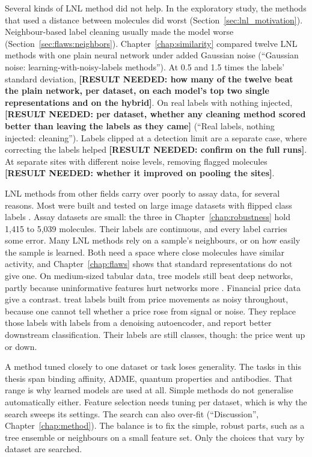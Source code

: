 Several kinds of LNL method did not help. In the exploratory study, the methods that used a distance between molecules did worst (Section~\ref{sec:lnl_motivation}). Neighbour-based label cleaning usually made the model worse (Section~\ref{sec:flaws:neighbors}). Chapter~\ref{chap:similarity} compared twelve LNL methods with one plain neural network under added Gaussian noise (``Gaussian noise: learning-with-noisy-labels methods''). At 0.5 and 1.5 times the labels' standard deviation, \textbf{[RESULT NEEDED: how many of the twelve beat the plain network, per dataset, on each model's top two single representations and on the hybrid]}. On real labels with nothing injected, \textbf{[RESULT NEEDED: per dataset, whether any cleaning method scored better than leaving the labels as they came]} (``Real labels, nothing injected: cleaning''). Labels clipped at a detection limit are a separate case, where correcting the labels helped \textbf{[RESULT NEEDED: confirm on the full runs]}. At separate sites with different noise levels, removing flagged molecules \textbf{[RESULT NEEDED: whether it improved on pooling the sites]}.

LNL methods from other fields carry over poorly to assay data, for several reasons. Most were built and tested on large image datasets with flipped class labels \citep{Song2022}. Assay datasets are small: the three in Chapter~\ref{chap:robustness} hold 1,415 to 5,039 molecules. Their labels are continuous, and every label carries some error. Many LNL methods rely on a sample's neighbours, or on how easily the sample is learned. Both need a space where close molecules have similar activity, and Chapter~\ref{chap:flaws} shows that standard representations do not give one. On medium-sized tabular data, tree models still beat deep networks, partly because uninformative features hurt networks more \citep{Grinsztajn2022}. Financial price data give a contrast. \citet{Ma2022} treat labels built from price movements as noisy throughout, because one cannot tell whether a price rose from signal or noise. They replace those labels with labels from a denoising autoencoder, and report better downstream classification. Their labels are still classes, though: the price went up or down.

A method tuned closely to one dataset or task loses generality. The tasks in this thesis span binding affinity, ADME, quantum properties and antibodies. That range is why learned models are used at all. Simple methods do not generalise automatically either. Feature selection needs tuning per dataset, which is why the search sweeps its settings. The search can also over-fit (``Discussion'', Chapter~\ref{chap:method}). The balance is to fix the simple, robust parts, such as a tree ensemble or neighbours on a small feature set. Only the choices that vary by dataset are searched.

